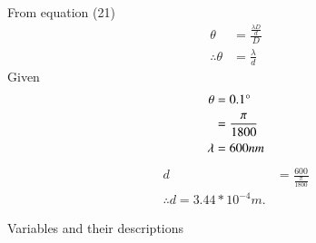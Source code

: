 \documentclass[journal,12pt,twocolumn]{IEEEtran}
\theoremstyle{remark}
\begin{document}
     From equation (21)
     \begin{align}
     \theta&=\frac{\frac{\lambda D}{d}}{D}\\
     \therefore \theta&=\frac{\lambda}{d}
 \end{align}
 Given
 \begin{align}
     \theta&=0.1\degree\\
&=\frac{\pi}{1800}\\
    \lambda&=600nm
 \end{align}
 \begin{align}
 d&=\frac{600}{\frac{\pi}{1800}}\\
 \therefore d= 3.44*10^{-4}m.
 \end{align}

 \newpage

 \renewcommand{\thefigure}{\theenumi}
 \renewcommand{\thetable}{\theenumi}

 \begin{flushleft}
     \begin{table}[h]
         \caption{Variables and their descriptions}
         \label{tab:table1.12.10.16}
         
     \end{table}
 \end{flushleft}
\end{document}
